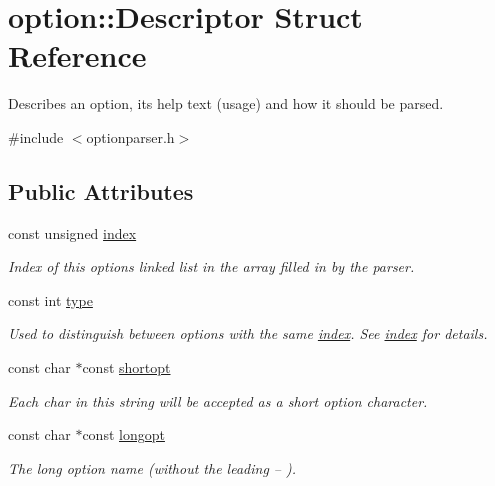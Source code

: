 \hypertarget{structoption_1_1Descriptor}{}\section{option\+:\+:Descriptor Struct Reference}
\label{structoption_1_1Descriptor}


Describes an option, its help text (usage) and how it should be parsed.  




{\ttfamily \#include $<$optionparser.\+h$>$}

\subsection*{Public Attributes}
\begin{DoxyCompactItemize}
\item 
const unsigned \hyperlink{structoption_1_1Descriptor_a1fee8ac44f529c99ac2b1149b4c391b1}{index}
\begin{DoxyCompactList}\small\item\em Index of this option\textquotesingle{}s linked list in the array filled in by the parser. \end{DoxyCompactList}\item 
const int \hyperlink{structoption_1_1Descriptor_a1b220dabd8aad075fa441a80f9b9343c}{type}
\begin{DoxyCompactList}\small\item\em Used to distinguish between options with the same \hyperlink{structoption_1_1Descriptor_a1fee8ac44f529c99ac2b1149b4c391b1}{index}. See \hyperlink{structoption_1_1Descriptor_a1fee8ac44f529c99ac2b1149b4c391b1}{index} for details. \end{DoxyCompactList}\item 
const char $\ast$const \hyperlink{structoption_1_1Descriptor_a0dba4ccca59c19d6ed4081391fca5adb}{shortopt}
\begin{DoxyCompactList}\small\item\em Each char in this string will be accepted as a short option character. \end{DoxyCompactList}\item 
const char $\ast$const \hyperlink{structoption_1_1Descriptor_a470c449dfa894c9bfda2dae026142b4b}{longopt}
\begin{DoxyCompactList}\small\item\em The long option name (without the leading {\ttfamily --} ). \end{DoxyCompactList}\item 

\end{DoxyCompactItemize}
